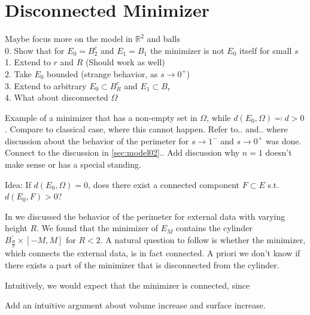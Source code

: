 \chapter{Disconnected Minimizer}
\label{ch:disconnected_minimizer}

\begin{TODO}
	Maybe focus more on the model in \( \mathbb{R}^2 \) and balls\\
	0. Show that for \( E_0 = B_2^c \) and \( E_1 = B_1 \) the minimizer is not \( E_0 \)
	itself for small \( s \) \\
	1. Extend to \( r \) and \( R \) (Should work as well)\\
	2. Take \( E_0 \) bounded (strange behavior, as \( s \to 0^+ \))\\
	3. Extend to arbitrary \( E_0 \subset B_R^c \) and \( E_1 \subset B_r \) \\
	4. What about disconnected \( \Omega \)
\end{TODO}

Example of a minimizer that has a non-empty set in \( \Omega \), while \( d(E_0, \Omega)
\eqqcolon d > 0 \).\newline
Compare to classical case, where this cannot happen. Refer to.. and.. where discussion
about the behavior of the perimeter for \( s \to 1^- \) and \( s \to 0^+ \) was done.
\newline
Connect to the discussion in \cref{sec:model02}..\newline
Add discussion why \( n = 1 \) doesn't make sense or has a special standing.\newline

Idea: If \( d(E_0, \Omega) = 0 \), does there exist a connected component \( F \subset E
\) s.t.\ \( d(E_0, F) > 0 \)?\newline

In  we discussed the behavior of the perimeter for external data with
varying height \( R \). We found that the minimizer of \( E_M \) contains the cylinder \(
B^\prime_{\frac{R}{2}} \times [-M, M] \) for \( R < 2 \). A natural question to follow is
whether the minimizer, which connects the external data, is in fact connected. A priori we
don't know if there exists a part of the minimizer that is disconnected from the
cylinder.\newline

Intuitively, we would expect that the minimizer is connected, since
\begin{TODO}
	Add an intuitive argument about volume increase and surface increase.
\end{TODO}

